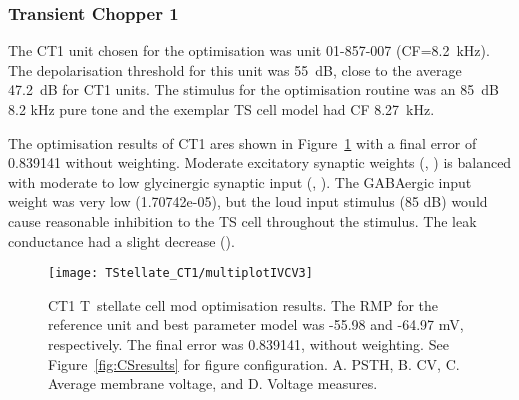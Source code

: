 
\clearpage
\subsubsection{Transient Chopper 1}

The CT1 unit chosen for the optimisation was unit 01-857-007 \citep{PaoliniClareyEtAl:2005} (CF=8.2~kHz).
The depolarisation threshold for this unit was 55~dB, close to the average 47.2~dB for CT1 units.
The stimulus for the optimisation routine was an 85~dB 8.2 kHz pure tone and the exemplar TS cell model had CF 8.27~kHz.

The optimisation results of CT1 ares shown in Figure~\ref{fig:CT1results} with a final error of 0.839141 without weighting.
Moderate excitatory synaptic weights (, ) is balanced with moderate to low glycinergic synaptic input (, ).
The GABAergic input weight was very low (\wGLGTS 1.70742e-05), but the loud input stimulus (85 dB) would cause reasonable inhibition to the TS cell throughout the stimulus.
The leak conductance had a slight decrease ().


\begin{figure}[htb]
  \centering
\texttt{[image: TStellate\_CT1/multiplotIVCV3]}
  \caption[CT1 T~stellate Optimisation results]{CT1 T~stellate cell mod optimisation results.
The RMP for the reference unit and best parameter     model was -55.98 and -64.97 mV, respectively.
The final error was 0.839141,     without weighting.
See Figure~\ref{fig:CSresults} for figure configuration.
A. PSTH, B. CV, C. Average membrane voltage, and D. Voltage measures.}
  \label{fig:CT1results}
\end{figure}

